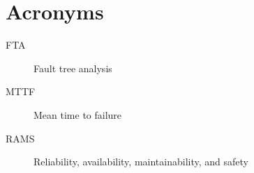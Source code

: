 
\chapter{Acronyms}
\begin{description}
\item[FTA] Fault tree analysis
\item[MTTF] Mean time to failure
\item[RAMS] Reliability, availability, maintainability, and safety
\end{description}